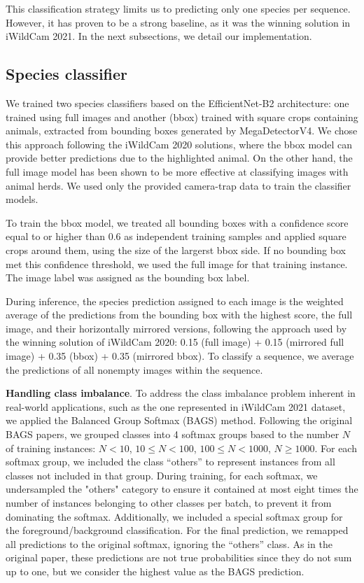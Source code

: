 This classification strategy limits us to predicting only one species per
sequence. However, it has proven to be a strong baseline, as it was the winning
solution in iWildCam 2021. In the next subsections, we detail our
implementation.

\subsection{Species classifier}

We trained two species classifiers based on the EfficientNet-B2 architecture:
one trained using full images and another (bbox) trained with square crops containing
animals, extracted from bounding boxes generated by MegaDetectorV4. We chose
this approach following the iWildCam 2020 solutions, where the bbox model can
provide better predictions due to the highlighted animal. On the other hand, the
full image model has been shown to be more effective at classifying images with
animal herds. We used only the provided camera-trap data to train the classifier
models.

To train the bbox model, we treated all bounding boxes with a
confidence score equal to or higher than 0.6 as independent training samples and
applied square crops around them, using the size of the largerst bbox side. If
no bounding box met this confidence threshold, we used the full image for that
training instance. The image label was assigned as the bounding box label.

During inference, the species prediction assigned to each image is the weighted
average of the predictions from the bounding box with the highest score, the
full image, and their horizontally mirrored versions, following the approach
used by the winning solution of iWildCam 2020: 0.15 (full image) + 0.15
(mirrored full image) + 0.35 (bbox) + 0.35 (mirrored bbox). To classify a
sequence, we average the predictions of all nonempty images within the sequence.

\textbf{Handling class imbalance}. To address the class imbalance problem
inherent in real-world applications, such as the one represented in iWildCam
2021 dataset, we applied the Balanced Group Softmax (BAGS) method. Following the
original BAGS papers, we grouped classes into 4 softmax groups based to the
number $N$ of training instances: $N < 10$, $10 \le N < 100$, $100 \le N <
1000$, $N \ge 1000$. For each softmax group, we included the class ``others'' to
represent instances from all classes not included in that group. During
training, for each softmax, we undersampled the "others" category to ensure it
contained at most eight times the number of instances belonging to other classes
per batch, to prevent it from dominating the softmax. Additionally, we included
a special softmax group for the foreground/background classification. For the
final prediction, we remapped all predictions to the original softmax, ignoring
the ``others'' class. As in the original paper, these predictions are not true
probabilities since they do not sum up to one, but we consider the highest value
as the BAGS prediction.

